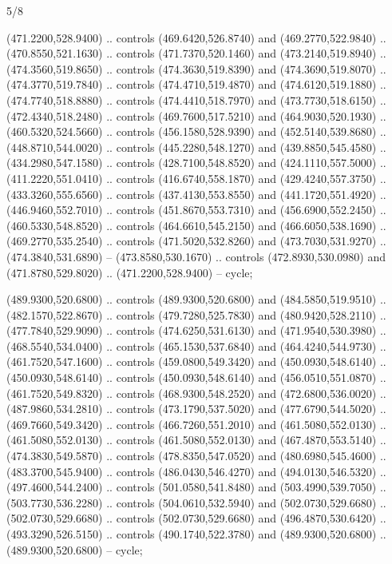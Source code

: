 \begin{flagdescription}{5/8}
\begin{scope}[shift={(m)}]
\begin{scope}[scale=\flagwidth/220,y=0.1mm, x=0.1mm, yscale=-1,shift={(-596,-360)}]
\begin{scope}[draw=black,line join=round,line cap=round,line width=0.381\lw]
\begin{scope}[line width=0.534\lw,fill=green]
 (471.2200,528.9400) .. controls (469.6420,526.8740) and
  (469.2770,522.9840) .. (470.8550,521.1630) .. controls (471.7370,520.1460) and
  (473.2140,519.8940) .. (474.3560,519.8650) .. controls (474.3630,519.8390) and
  (474.3690,519.8070) .. (474.3770,519.7840) .. controls (474.4710,519.4870) and
  (474.6120,519.1880) .. (474.7740,518.8880) .. controls (474.4410,518.7970) and
  (473.7730,518.6150) .. (472.4340,518.2480) .. controls (469.7600,517.5210) and
  (464.9030,520.1930) .. (460.5320,524.5660) .. controls (456.1580,528.9390) and
  (452.5140,539.8680) .. (448.8710,544.0020) .. controls (445.2280,548.1270) and
  (439.8850,545.4580) .. (434.2980,547.1580) .. controls (428.7100,548.8520) and
  (424.1110,557.5000) .. (411.2220,551.0410) .. controls (416.6740,558.1870) and
  (429.4240,557.3750) .. (433.3260,555.6560) .. controls (437.4130,553.8550) and
  (441.1720,551.4920) .. (446.9460,552.7010) .. controls (451.8670,553.7310) and
  (456.6900,552.2450) .. (460.5330,548.8520) .. controls (464.6610,545.2150) and
  (466.6050,538.1690) .. (469.2770,535.2540) .. controls (471.5020,532.8260) and
  (473.7030,531.9270) .. (474.3840,531.6890) -- (473.8580,530.1670) .. controls
  (472.8930,530.0980) and (471.8780,529.8020) .. (471.2200,528.9400) -- cycle;

 (489.9300,520.6800) .. controls (489.9300,520.6800) and
  (484.5850,519.9510) .. (482.1570,522.8670) .. controls (479.7280,525.7830) and
  (480.9420,528.2110) .. (477.7840,529.9090) .. controls (474.6250,531.6130) and
  (471.9540,530.3980) .. (468.5540,534.0400) .. controls (465.1530,537.6840) and
  (464.4240,544.9730) .. (461.7520,547.1600) .. controls (459.0800,549.3420) and
  (450.0930,548.6140) .. (450.0930,548.6140) .. controls (450.0930,548.6140) and
  (456.0510,551.0870) .. (461.7520,549.8320) .. controls (468.9300,548.2520) and
  (472.6800,536.0020) .. (487.9860,534.2810) .. controls (473.1790,537.5020) and
  (477.6790,544.5020) .. (469.7660,549.3420) .. controls (466.7260,551.2010) and
  (461.5080,552.0130) .. (461.5080,552.0130) .. controls (461.5080,552.0130) and
  (467.4870,553.5140) .. (474.3830,549.5870) .. controls (478.8350,547.0520) and
  (480.6980,545.4600) .. (483.3700,545.9400) .. controls (486.0430,546.4270) and
  (494.0130,546.5320) .. (497.4600,544.2400) .. controls (501.0580,541.8480) and
  (503.4990,539.7050) .. (503.7730,536.2280) .. controls (504.0610,532.5940) and
  (502.0730,529.6680) .. (502.0730,529.6680) .. controls (502.0730,529.6680) and
  (496.4870,530.6420) .. (493.3290,526.5150) .. controls (490.1740,522.3780) and
  (489.9300,520.6800) .. (489.9300,520.6800) -- cycle;


\end{scope}
\end{scope}
\end{scope}
\end{scope}
\end{flagdescription}

